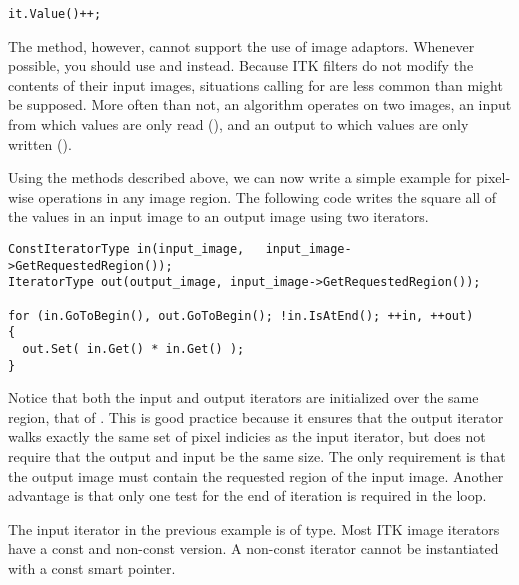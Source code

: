 \begin{verbatim}
it.Value()++;
\end{verbatim}

The  method, however, cannot support the use of image adaptors.
Whenever possible, you should use  and  instead.  Because
ITK filters do not modify the contents of their input images, situations
calling for  are less common than might be supposed.  More often
than not, an algorithm operates on two images, an input from which values are
only read (), and an output to which values are only written
().

Using the methods described above, we can now write a simple example for
pixel-wise operations in any image region.  The following code writes the
square all of the values in an input image to an output image using two
iterators.

\begin{verbatim}
ConstIteratorType in(input_image,   input_image->GetRequestedRegion());
IteratorType out(output_image, input_image->GetRequestedRegion());

for (in.GoToBegin(), out.GoToBegin(); !in.IsAtEnd(); ++in, ++out)
{
  out.Set( in.Get() * in.Get() );
}
\end{verbatim}

Notice that both the input and output iterators are initialized over the same
region, that of .  This is good practice because it ensures
that the output iterator walks exactly the same set of pixel indicies as the
input iterator, but does not require that the output and input be the same
size.  The only requirement is that the output image must contain the requested
region of the input image.  Another advantage is that only one test for the end
of iteration is required in the  loop.

The input iterator in the previous example is of  type.  Most ITK
image iterators have a const and non-const version.  A non-const iterator
cannot be instantiated with a const  smart pointer.



